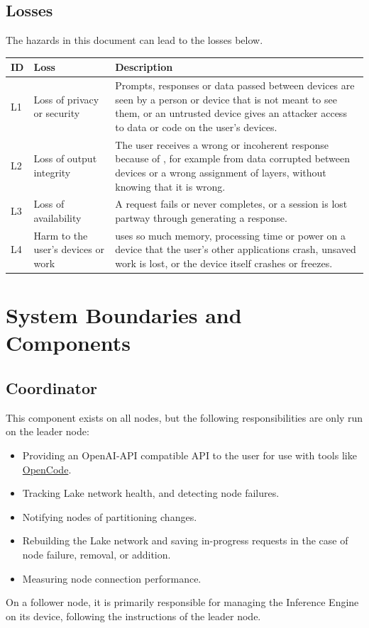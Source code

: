 \documentclass{article}
\begin{document}
\subsection{Losses}
\label{SecLosses}

The hazards in this document can lead to the losses below.

\begin{center}
\begin{tabularx}{\textwidth}{l>{\raggedright\arraybackslash}p{3.4cm}X}
\toprule
\textbf{ID} & \textbf{Loss} & \textbf{Description}\\
\midrule
L1 & Loss of privacy or security & Prompts, responses or data passed between
  devices are seen by a person or device that is not meant to see them, or an
  untrusted device gives an attacker access to data or code on the user's
  devices.\\
L2 & Loss of output integrity & The user receives a wrong or incoherent
  response because of \progname{}, for example from data corrupted between
  devices or a wrong assignment of layers, without knowing that it is
  wrong.\\
L3 & Loss of availability & A request fails or never completes, or a session
  is lost partway through generating a response.\\
L4 & Harm to the user's devices or work & \progname{} uses so much memory,
  processing time or power on a device that the user's other applications
  crash, unsaved work is lost, or the device itself crashes or freezes.\\
\bottomrule
\end{tabularx}
\end{center}

\section{System Boundaries and Components}

\subsection{Coordinator}
\label{subsec:coordinator}
This component exists on all nodes, but the following responsibilities are only run on the leader node:
\begin{itemize}
	\item Providing an OpenAI-API compatible API to the user for use with tools like
		\href{https://opencode.ai/}{OpenCode}.
	\item Tracking Lake network health, and detecting node failures.
	\item Notifying nodes of partitioning changes.
	\item Rebuilding the Lake network and saving in-progress requests
		in the case of node failure, removal, or addition.
	\item Measuring node connection performance.
\end{itemize}
On a follower node, it is primarily responsible for managing the Inference Engine
on its device, following the instructions of the leader node.
\end{document}
